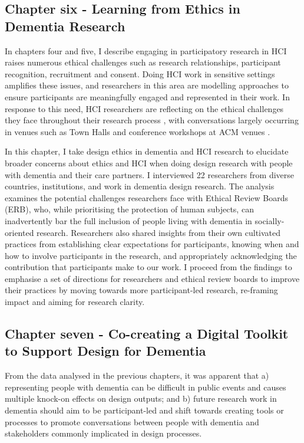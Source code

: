 \subsection{Chapter six - Learning from Ethics in Dementia Research}
\label{Intro:ChapterSix}
In chapters four and five, I describe engaging in participatory research in HCI raises numerous ethical challenges such as research relationships, participant recognition, recruitment and consent. Doing HCI work in sensitive settings amplifies these issues, and researchers in this area are modelling approaches to ensure participants are meaningfully engaged and represented in their work. In response to this need, HCI researchers are reflecting on the ethical challenges they face throughout their research process \citep{vines_designing_2013}, with conversations largely occurring in venues such as Town Halls \citep{munteanu_sigchi_2019,bruckman_cscw_2017} and conference workshops at ACM venues \citep{davis_ethical_2015,waycott_challenge_2015}.

In this chapter, I take design ethics in dementia and HCI research to elucidate broader concerns about ethics and HCI when doing design research with people with dementia and their care partners. I interviewed 22 researchers from diverse countries, institutions, and work in dementia design research. The analysis examines the potential challenges researchers face with Ethical Review Boards (ERB), who, while prioritising the protection of human subjects, can inadvertently bar the full inclusion of people living with dementia in socially-oriented research. Researchers also shared insights from their own cultivated practices from establishing clear expectations for participants, knowing when and how to involve participants in the research, and appropriately acknowledging the contribution that participants make to our work. I proceed from the findings to emphasise a set of directions for researchers and ethical review boards to improve their practices by moving towards more participant-led research, re-framing impact and aiming for research clarity.

\subsection{Chapter seven - Co-creating a Digital Toolkit to Support Design for Dementia}
\label{Intro:ChapterSeven}
From the data analysed in the previous chapters, it was apparent that a) representing people with dementia can be difficult in public events and causes multiple knock-on effects on design outputs; and b) future research work in dementia should aim to be participant-led and shift towards creating tools or processes to promote conversations between people with dementia and stakeholders commonly implicated in design processes.


